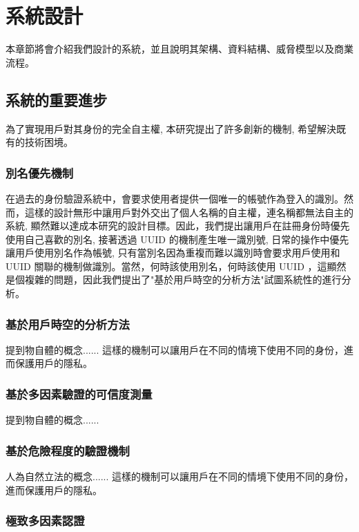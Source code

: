 
\chapter{系統設計}

本章節將會介紹我們設計的系統，並且說明其架構、資料結構、威脅模型以及商業流程。

\section{系統的重要進步}

為了實現用戶對其身份的完全自主權, 本研究提出了許多創新的機制, 希望解決既有的技術困境。

\subsection{別名優先機制}

在過去的身份驗證系統中，會要求使用者提供一個唯一的帳號作為登入的識別。然而，這樣的設計無形中讓用戶對外交出了個人名稱的自主權，連名稱都無法自主的系統, 顯然難以達成本研究的設計目標。因此，我們提出讓用戶在註冊身份時優先使用自己喜歡的別名, 接著透過 UUID 的機制產生唯一識別號, 日常的操作中優先讓用戶使用別名作為帳號, 只有當別名因為重複而難以識別時會要求用戶使用和 UUID 關聯的機制做識別。當然，何時該使用別名，何時該使用 UUID ，這顯然是個複雜的問題，因此我們提出了"基於用戶時空的分析方法"試圖系統性的進行分析。

\subsection{基於用戶時空的分析方法}

提到物自體的概念...... 這樣的機制可以讓用戶在不同的情境下使用不同的身份，進而保護用戶的隱私。

\subsection{基於多因素驗證的可信度測量}

提到物自體的概念......

\subsection{基於危險程度的驗證機制}

人為自然立法的概念...... 這樣的機制可以讓用戶在不同的情境下使用不同的身份，進而保護用戶的隱私。

\subsection{極致多因素認證}

